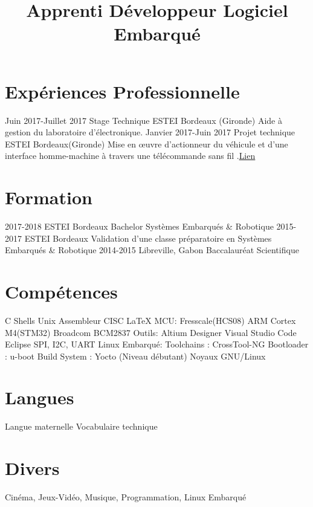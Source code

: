 \documentclass[10pts,a4paper,sans]{moderncv}
\title{Apprenti D\'{e}veloppeur Logiciel Embarqu\'{e}}
\begin{document}
\maketitle

\section{Exp\'{e}riences Professionnelle}
\cventry{} {Juin 2017-Juillet 2017} {Stage Technique} {ESTEI} {Bordeaux (Gironde)} {Aide à gestion du laboratoire d’électronique.} {}
\cventry{} {Janvier 2017-Juin 2017} {Projet technique} {ESTEI} {Bordeaux(Gironde)} {Mise en œuvre d'actionneur du véhicule et d'une interface homme-machine à travers une télécommande sans fil .\href{https://github.com/jorisoffouga/projet_vehicule_interactif_B2}{Lien}}
{} {}

\section{Formation}
\cventry{} {2017-2018} {ESTEI} {Bordeaux} {Bachelor Systèmes Embarqués \& Robotique} {}
\cventry{} {2015-2017} {ESTEI} {Bordeaux} {Validation d'une classe préparatoire en Systèmes Embarqués \& Robotique} {}
\cventry{} {2014-2015} {Libreville, Gabon} {Baccalauréat Scientifique} {} {}

\section{Compétences}
 {C \newline {} Shells Unix \newline {} Assembleur CISC \newline {} \LaTeX} {MCU:} {Fresscale(HCS08) \newline {} ARM Cortex M4(STM32)}
 {Broadcom BCM2837} {Outils:} {Altium Designer \newline {} Visual Studio Code \newline {} Eclipse}
 {SPI, I2C, UART} {Linux Embarqu\'{e}:}{ 
	Toolchains : CrossTool-NG
	\newline {} Bootloader : u-boot
	\newline {} Build System : Yocto (Niveau débutant)
	\newline {} Noyaux GNU/Linux
}

\section{Langues}
 {Langue maternelle}
 {Vocabulaire technique}
 
\newpage
\section{Divers}
 {Cinéma, Jeux-Vidéo, Musique, Programmation, Linux Embarqué}
\end{document}
